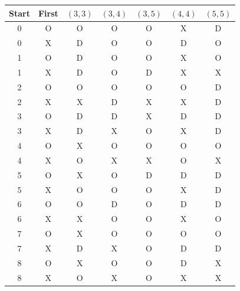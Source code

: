 \begin{tabular}{ccccccc}
\toprule
Start & First & $(3,3)$ & $(3,4)$ & $(3,5)$ & $(4,4)$ & $(5,5)$ \\
\midrule
0 & O & O & O & O & X & D \\
0 & X & D & O & O & D & O \\
1 & O & D & O & O & X & O \\
1 & X & D & O & D & X & X \\
2 & O & O & O & O & O & D \\
2 & X & X & D & X & X & D \\
3 & O & D & D & X & D & D \\
3 & X & D & X & O & X & D \\
4 & O & X & O & O & O & O \\
4 & X & O & X & X & O & X \\
5 & O & X & O & D & D & D \\
5 & X & O & O & O & X & D \\
6 & O & O & D & O & D & D \\
6 & X & X & O & O & X & O \\
7 & O & X & O & O & O & O \\
7 & X & D & X & O & D & D \\
8 & O & X & O & O & D & X \\
8 & X & O & X & O & X & X \\
\bottomrule
\end{tabular}
